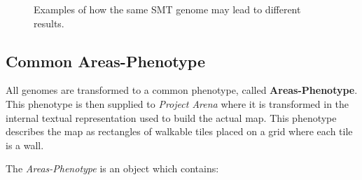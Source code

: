 \documentclass{Configuration_Files/PoliMi3i_thesis}
\begin{document}
\begin{figure}[hbt!]
    \centering
    \qquad
    \caption[SMT-Genome determinism]{Examples of how the same SMT genome may lead to different results.}
    \label{fig:smt_genome_determinism}
\end{figure}


\subsection{Common Areas-Phenotype}
All genomes are transformed to a common phenotype, called \textbf{Areas-Phenotype}. This phenotype is then supplied to \textit{Project Arena} where it is transformed in the internal textual representation used to build the actual map. This phenotype describes the map as rectangles of walkable tiles placed on a grid where each tile is a wall.

The \textit{Areas-Phenotype} is an object which contains:
\end{document}
